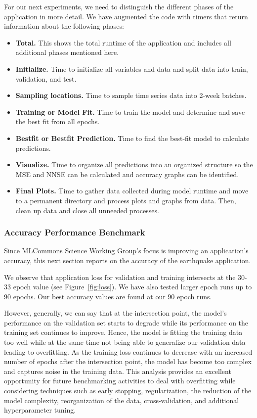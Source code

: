 \documentclass[utf8]{FrontiersinVancouver} %
\begin{document}
For our next experiments, we need to distinguish the different phases of the application in more detail. We have augmented the code with timers that return information about the following phases:

\begin{itemize}
\item {\bf Total.} This shows the total runtime of the application and includes all additional phases mentioned here.
\item {\bf Initialize.} Time to initialize all variables and data and split data into train, validation, and test.
\item {\bf Sampling locations.} Time to sample time series data into 2-week batches.
\item {\bf Training or Model Fit.} Time to train the model and determine and save the best fit from all epochs.
\item {\bf Bestfit or Bestfit Prediction.} Time to find the best-fit model to calculate predictions.
\item {\bf Visualize.} Time to organize all predictions into an organized structure so the MSE and NNSE can be calculated and accuracy graphs can be identified.
\item {\bf Final Plots.} Time to gather data collected during model runtime and move to a permanent directory and process plots and graphs from data. Then, clean up data and close all unneeded processes.
\end{itemize}


\subsubsection{Accuracy Performance Benchmark}
\label{sec:perf-accuracy}

Since MLCommons Science Working Group's focus is improving an application’s accuracy, this next section reports on the accuracy of the earthquake application.

We observe that application loss for validation and training intersects at the 30-33 epoch value (see Figure~\ref{fig:loss}). We have also tested larger epoch runs up to 90 epochs. Our best accuracy values are found at our 90 epoch runs.

However, generally, we can say that at the intersection point, the model's performance on the validation set starts to degrade while its performance on the training set continues to improve. Hence, the  model is fitting the training data too well while at the same time not being able to generalize our validation data leading to overfitting. As the training loss continues to decrease with an increased number of epochs after the intersection point, the model has become too complex and captures noise in the training data. This analysis provides an excellent opportunity for future benchmarking activities to deal with overfitting while considering techniques such as early stopping, regularization, the reduction of the model complexity, reorganization of the data, cross-validation, and additional hyperparameter tuning. 
\end{document}

